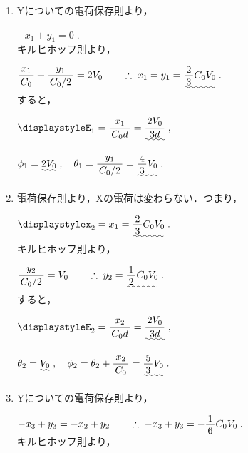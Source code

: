 ﻿\documentclass[../../../ps_a.tex]{subfiles}
\begin{document}
    \begin{enumerate}
        \item Yについての電荷保存則より，
            
            \myspaceb%
            $\displaystyle%
                -x_1 + y_1 = 0 \;.
            $\\            
            キルヒホッフ則より，
            
            \myspaceb%
            $\displaystyle%
                \myfracc{x_1}{C_0} + \myfracc{y_1}{C_0/2} = 2V_0%
                \qquad \therefore \; x_1 = y_1
                = \uwave{\myfraca{2}{3}C_0 V_0} \;.
            $\\
            すると，
            
            \myspaceb%
            $\displaystyle%
                E_1 = \myfracc{x_1}{C_0 d} = \uwave{\myfracc{2V_0}{3d}} \;, 
            $

            \myspaceb%
            $\displaystyle%
                \phi_1 = \uwave{2V_0} \;,%
                \quad \theta_1 = \myfracc{y_1}{C_0/2} = \uwave{\myfraca{4}{3}V_0} \;.
            $            
        \item 電荷保存則より，Xの電荷は変わらない．つまり，
            
            \myspaceb%
            $\displaystyle%
                x_2 = x_1 = \uwave{\myfraca{2}{3}C_0 V_0} \;.
            $\\
            キルヒホッフ則より，
            
            \myspaceb%
            $\displaystyle%
                \myfracc{y_2}{C_0/2} = V_0%
                \qquad \therefore \; y_2 = \uwave{\myfraca{1}{2}C_0 V_0} \;.
            $\\
            すると，
            
            \myspaceb%
            $\displaystyle%
                E_2 = \myfracc{x_2}{C_0 d} = \uwave{\myfracc{2V_0}{3d}} \;,
            $

            \myspaceb%
            $\displaystyle%
                \theta_2 = \uwave{V_0} \;,%
                \quad \phi_2 = \theta_2 + \myfracc{x_2}{C_0}%
                = \uwave{\myfraca{5}{3}V_0} \;.
            $
        \item Yについての電荷保存則より，
            
            \myspaceb%
            $\displaystyle%
                -x_3 + y_3 = -x_2 + y_2%
                \qquad \therefore \; -x_3 + y_3 = -\myfraca{1}{6}C_0 V_0 \;.
            $\\
            キルヒホッフ則より，
            

\end{enumerate}
\end{document}

